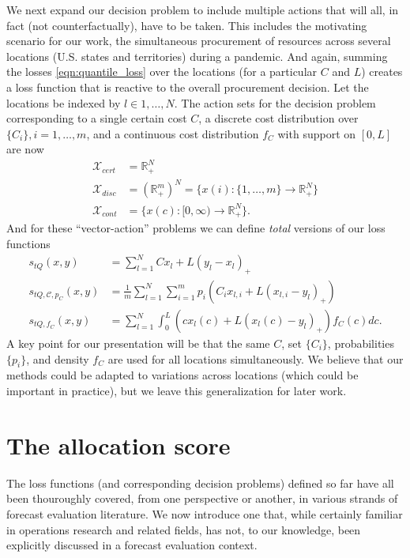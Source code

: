 \documentclass{article}
\begin{document}
We next expand our decision problem to include multiple actions that will all, in fact (not counterfactually), have to be taken.  This includes the motivating scenario for our work, the simultaneous procurement of resources across several locations (U.S. states and territories) during a pandemic. And again, summing the losses  \eqref{eqn:quantile_loss} over the locations (for a particular $C$ and $L$) creates a loss function that is reactive to the overall procurement decision. Let the locations be indexed by $l \in 1,\ldots,N$.  The action sets for the decision problem corresponding to a single certain cost $C$, a discrete cost distribution over $\{C_i\}, i = 1,\ldots,m$, and a continuous cost distribution $f_C$ with support on $[0,L]$ are now
\begin{align}
\mathcal{X}_{cert} &= \mathbb{R}_{+}^N \\
\mathcal{X}_{disc} &= (\mathbb{R}_{+}^m)^N = \{x(i):\{1,\ldots,m\} \to \mathbb{R}_{+}^N\}\\
\mathcal{X}_{cont} &= \{x(c):[0,\infty) \to \mathbb{R}_{+}^N\}.
\end{align}
And for these ``vector-action'' problems we can define \emph{total} versions of our loss functions
\begin{align}
s_{tQ}(x,y) &= \sum_{l=1}^N Cx_l + L(y_l-x_l)_+ \\
s_{tQ, \mathcal{C}, p_C}(x,y) &= \frac{1}{m}\sum_{l=1}^N \sum_{i=1}^{m}p_i(C_i x_{l,i} + L(x_{l,i} - y_l)_+)\\
s_{tQ, f_C}(x,y) &= \sum_{l=1}^N \int_{0}^{L} (cx_l(c) + L(x_l(c) - y_l)_+) f_C(c)dc.
\end{align}
A key point for our presentation will be that the same $C$, set $\{C_i\}$, probabilities $\{p_i\}$, and density $f_C$ are used for all locations simultaneously.  We believe that our methods could be adapted to variations across locations (which could be important in practice), but we leave this generalization for later work. 

\section{The allocation score}

The loss functions (and corresponding decision problems) defined so far have all been thouroughly covered, from one perspective or another, in various strands of forecast evaluation literature.  We now introduce one that, while certainly familiar in operations research and related fields, has not, to our knowledge, been explicitly discussed in a forecast evaluation context. 
\end{document}
